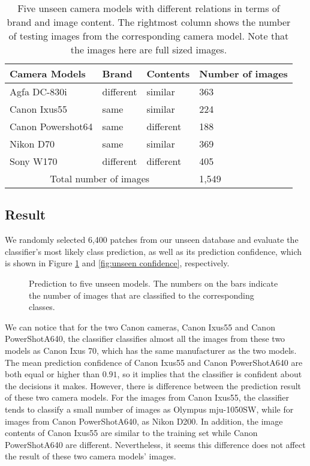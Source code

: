 \documentclass[a4paper, 9pt, twocolumn]{extarticle}
\begin{document}
\begin{table}
	\center
	\begin{tabular}{ |p{2.8cm}|p{1.1cm}|p{1.2cm}|p{1.6cm}| }
		\hline
		Camera Models & Brand & Contents & Number of images\\
		\hline
		Agfa DC-830i & different & similar & 363 \\
		Canon Ixus55 & same & similar & 224 \\
		Canon Powershot64 & same & different & 188 \\
		Nikon D70 & same & similar & 369 \\
		Sony W170 & different & different & 405 \\
		\hline
		\multicolumn{3}{|c|}{Total number of images} & 1,549 \\
		\hline
	\end{tabular}
	\caption{\label{tab:makes} Five unseen camera models with different relations in terms of brand and image content. The rightmost column shows the number of testing images from the corresponding camera model. Note that the images here are full sized images.}
\end{table}

\subsection*{Result}
\label{section:unseen result}

We randomly selected 6,400 patches from our unseen database and evaluate the classifier's most likely class prediction, as well as its prediction confidence, which is shown in Figure \ref{fig:unseen result} and \ref{fig:unseen confidence}, respectively. 

\begin{figure}
	\centering
	\resizebox{!}{!}{
		{}
	}
	\caption{Prediction to five unseen models. The numbers on the bars indicate the number of images that are classified to the corresponding classes.}
	\label{fig:unseen result}
\end{figure} 

We can notice that for the two Canon cameras, Canon Ixus55 and Canon PowerShotA640, the classifier classifies almost all the images from these two models as Canon Ixus 70, which has the same manufacturer as the two models. The mean prediction confidence of Canon Ixus55 and Canon PowerShotA640 are both equal or higher than $ 0.91 $, so it implies that the classifier is confident about the decisions it makes. However, there is difference between the prediction result of these two camera models. For the images from Canon Ixus55, the classifier tends to classify a small number of images as Olympus mju-1050SW, while for images from Canon PowerShotA640, as Nikon D200. In addition, the image contents of Canon Ixus55 are similar to the training set while Canon PowerShotA640 are different. Nevertheless, it seems this difference does not affect the result of these two camera models' images.
\end{document}
